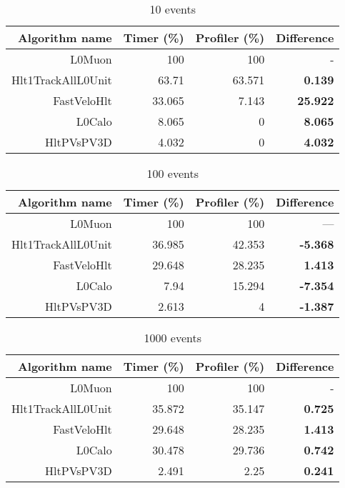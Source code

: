 \begin{table}[H]
\caption{10 events}
\label{tab:tevents10}
\begin{center}
\begin{tabular}{rrrr}\toprule
Algorithm name & Timer (\%) & Profiler (\%) & \bf{Difference} \\
\midrule
L0Muon & 100 & 100 & -\\
Hlt1TrackAllL0Unit & 63.71 & 63.571 & \bf{0.139}\\
FastVeloHlt & 33.065 & 7.143 & \bf{25.922}\\
L0Calo & 8.065 & 0 & \bf{8.065}\\
HltPVsPV3D & 4.032 & 0 & \bf{4.032}\\
\bottomrule
\end{tabular}
\end{center}
\end{table}

\begin{table}[H]
\caption{100 events}
\label{tab:tevents100}
\begin{center}
\begin{tabular}{rrrr}\toprule
Algorithm name & Timer (\%) & Profiler (\%) & \bf{Difference} \\
\midrule
L0Muon & 100 & 100 & --- \\
Hlt1TrackAllL0Unit & 36.985 & 42.353 & \bf{-5.368}\\
FastVeloHlt & 29.648 & 28.235 & \bf{1.413}\\
L0Calo & 7.94 & 15.294 & \bf{-7.354}\\
HltPVsPV3D & 2.613 & 4 & \bf{-1.387}\\
\bottomrule
\end{tabular}
\end{center}
\end{table}

\begin{table}[H]
\caption{1000 events}
\label{tab:tevents1000}
\begin{center}
\begin{tabular}{rrrr}\toprule
Algorithm name & Timer (\%) & Profiler (\%) & \bf{Difference} \\
\midrule
L0Muon & 100 & 100 & -\\
Hlt1TrackAllL0Unit & 35.872 & 35.147 & \bf{0.725}\\
FastVeloHlt & 29.648 & 28.235 & \bf{1.413}\\
L0Calo & 30.478 & 29.736 & \bf{0.742}\\
HltPVsPV3D & 2.491 & 2.25 & \bf{0.241}\\
\bottomrule
\end{tabular}
\end{center}
\end{table}


